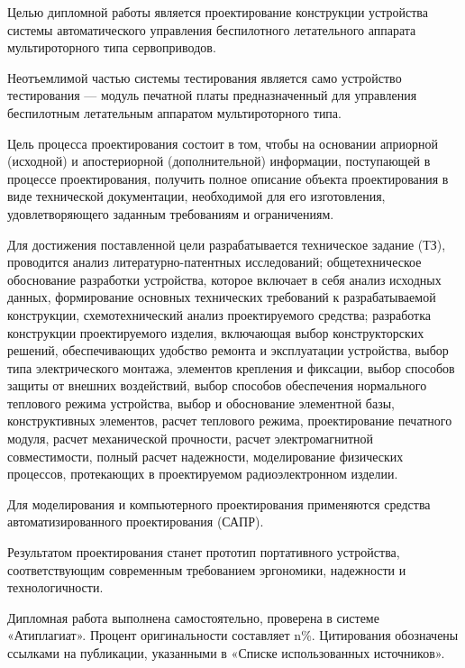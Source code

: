 Целью дипломной работы является проектирование конструкции
устройства системы автоматического управления
беспилотного летательного аппарата мультироторного типа сервоприводов.

Неотъемлимой частью системы тестирования является само устройство
тестирования — модуль печатной платы предназначенный для
управления беспилотным летательным аппаратом мультироторного типа.

Цель процесса проектирования состоит в том, чтобы на основании
априорной (исходной) и апостериорной (дополнительной) информации,
поступающей в процессе проектирования, получить полное описание
объекта проектирования в виде технической документации, необходимой
для его изготовления, удовлетворяющего заданным требованиям и
ограничениям.

Для достижения поставленной цели разрабатывается техническое задание
(ТЗ), проводится анализ литературно-патентных исследований;
общетехническое обоснование разработки устройства, которое включает в
себя анализ исходных данных, формирование основных технических
требований к разрабатываемой конструкции, схемотехнический анализ
проектируемого средства; разработка конструкции проектируемого
изделия, включающая выбор конструкторских решений, обеспечивающих
удобство ремонта и эксплуатации устройства, выбор типа электрического
монтажа, элементов крепления и фиксации, выбор способов защиты от
внешних воздействий, выбор способов обеспечения нормального теплового
режима устройства, выбор и обоснование элементной базы, конструктивных
элементов, расчет теплового режима, проектирование печатного модуля,
расчет механической прочности, расчет электромагнитной совместимости,
полный расчет надежности, моделирование физических процессов,
протекающих в проектируемом радиоэлектронном изделии.

Для моделирования и компьютерного проектирования применяются средства
автоматизированного проектирования (САПР).

Результатом проектирования станет прототип портативного устройства,
соответствующим современным требованием эргономики, надежности и
технологичности.

Дипломная работа выполнена самостоятельно, проверена в системе
«Атиплагиат».  Процент оригинальности составляет n\%. Цитирования
обозначены ссылками на публикации, указанными в «Списке использованных
источников».

\newpage
